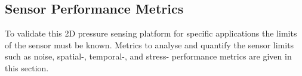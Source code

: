 \subsection{Sensor Performance Metrics}\label{sec:Sensor Performance Metrics2}
To validate this 2D pressure sensing platform for specific applications the limits of the sensor must be known. Metrics to analyse and quantify the sensor limits such as noise, spatial-, temporal-, and stress- performance metrics are given in this section.


